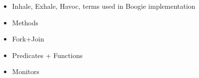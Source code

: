 \begin{sketch}
\begin{itemize}
\item Inhale, Exhale, Havoc, terms used in Boogie implementation
\end{itemize}
\end{sketch}
\begin{sketch}
\begin{itemize}
\item Methods
\end{itemize}
\end{sketch}
\begin{sketch}
\begin{itemize}
\item Fork+Join
\end{itemize}
\end{sketch}
\begin{sketch}
\begin{itemize}
\item Predicates + Functions
\end{itemize}
\end{sketch}
\begin{sketch}
\begin{itemize}
\item Monitors
\end{itemize}
\end{sketch}